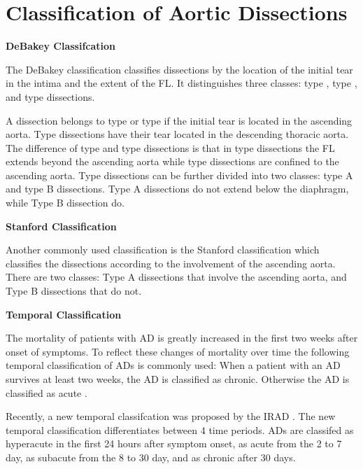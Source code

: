 \documentclass[thesis.tex]{subfiles}
\begin{document}
\section{Classification of Aortic Dissections}

\textbf{DeBakey Classifcation}

The DeBakey classification \cite{desanctis1987aortic,goldfinger2014thoracic,criado2011aortic} classifies dissections by the location of the initial tear in the intima and the extent of the FL. It distinguishes three classes: type , type , and type  dissections. 

A dissection belongs to type  or type  if the initial tear is located in the ascending aorta. Type  dissections have their tear located in the descending thoracic aorta. The difference of type  and type  dissections is that in type  dissections the FL extends beyond the ascending aorta while type  dissections are confined to the ascending aorta. Type  dissections can be further divided into two classes: type  A and type  B dissections. Type  A dissections do not extend below the diaphragm, while Type  B dissection do.

\textbf{Stanford Classification}

Another commonly used classification is the Stanford classification \cite{desanctis1987aortic,goldfinger2014thoracic,criado2011aortic} which classifies the dissections according to the involvement of the ascending aorta. There are two classes: Type A dissections that involve the ascending aorta, and Type B dissections that do not. 

\textbf{Temporal Classification}

The mortality of patients with AD is greatly increased in the first two weeks after onset of symptoms. To reflect these changes of mortality over time the following temporal classification of ADs is commonly used: When a patient with an AD survives at least two weeks, the AD is classified as chronic. Otherwise the AD is classified as acute \cite{olsson2007thoracic,desanctis1987aortic,criado2011aortic}.

Recently, a new temporal classifcation was proposed by the IRAD \cite{doi:10.1161/CIRCULATIONAHA.117.031264}. The new temporal classification differentiates between 4 time periods. ADs are classifed as hyperacute in the first 24 hours after symptom onset, as acute from the 2 to 7 day, as subacute from the 8 to 30 day, and as chronic after 30 days.  
\end{document}
